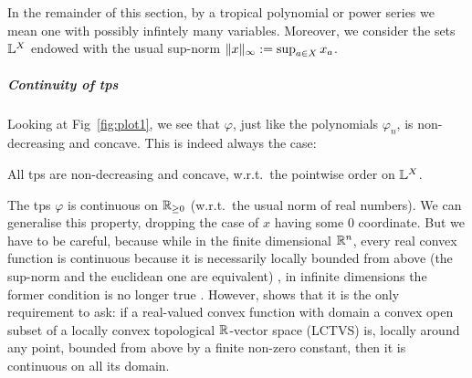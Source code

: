 %
In the remainder of this section, by a tropical polynomial or power series we mean one with possibly infintely many variables. Moreover, we consider the sets $\mathbb{L}^X$ endowed with the usual sup-norm $\lVert x\rVert_\infty:=\sup_{a\in X} x_a$. 

\subparagraph*{Continuity of tps}\label{subsec:cont}%

Looking at Fig~\ref{fig:plot1}, we see that $\varphi$, just like the polynomials $\varphi_{n}$, is non-decreasing and concave.
This is indeed always the case:

\begin{proposition}\label{prop:nondecr+conc}
 All tps 
are non-decreasing and concave, w.r.t.\ the pointwise order on $\mathbb{L}^{X}$.
\end{proposition}


The tps $\varphi$ is continuous on $\mathbb{R}_{\geq0}$ (w.r.t.\ the usual norm of real numbers).
We can generalise this property, dropping the case of $x$ having some $0$ coordinate.
But we have to be careful, because while in the finite dimensional $\mathbb{R}^n$, every real convex function is continuous because it is necessarily locally bounded from above (the sup-norm and the euclidean one are equivalent) \cite[Proposition 4.7]{Cobzas2017}, in infinite dimensions the former condition is no longer true \cite[Example 4.8]{Cobzas2017}.
However, \cite[Proposition 4.4.(3)]{Cobzas2017} shows that it is the only requirement to ask: if a real-valued convex function with domain a convex open subset of a locally convex topological $\mathbb{R}$-vector space (LCTVS) is, locally around any point, bounded from above by a finite non-zero constant, then it is continuous on all its domain.

